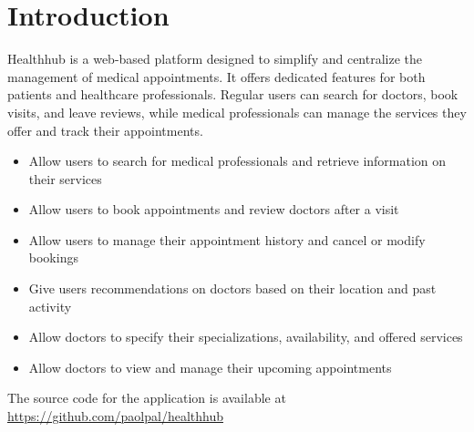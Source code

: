 \chapter{Introduction}
Healthhub is a web-based platform designed to simplify and centralize the management of medical appointments. It offers dedicated features for both patients and healthcare professionals. Regular users can search for doctors, book visits, and leave reviews, while medical professionals can manage the services they offer and track their appointments.

    \begin{itemize}
        \item Allow users to search for medical professionals and retrieve information on their services
        \item Allow users to book appointments and review doctors after a visit
        \item Allow users to manage their appointment history and cancel or modify bookings
        \item Give users recommendations on doctors based on their location and past activity
        \item Allow doctors to specify their specializations, availability, and offered services
        \item Allow doctors to view and manage their upcoming appointments
    \end{itemize}
The source code for the application is available at \url{https://github.com/paolpal/healthhub}
